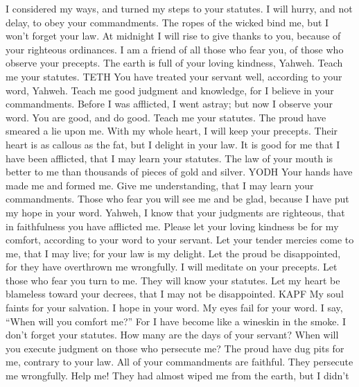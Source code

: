  I considered my ways, and turned my steps to your
statutes.  I will hurry, and not delay, to obey your
commandments.  The ropes of the wicked bind me, but I
won't forget your law.  At midnight I will rise to give
thanks to you, because of your righteous ordinances.  I
am a friend of all those who fear you, of those who observe your
precepts.  The earth is full of your loving kindness,
Yahweh. Teach me your statutes. TETH  You have treated
your servant well, according to your word, Yahweh.  Teach
me good judgment and knowledge, for I believe in your commandments.
 Before I was afflicted, I went astray; but now I observe
your word.  You are good, and do good. Teach me your
statutes.  The proud have smeared a lie upon me. With my
whole heart, I will keep your precepts.  Their heart is
as callous as the fat, but I delight in your law.  It is
good for me that I have been afflicted, that I may learn your statutes.
 The law of your mouth is better to me than thousands of
pieces of gold and silver. YODH  Your hands have made me
and formed me. Give me understanding, that I may learn your
commandments.  Those who fear you will see me and be
glad, because I have put my hope in your word.  Yahweh, I
know that your judgments are righteous, that in faithfulness you have
afflicted me.  Please let your loving kindness be for my
comfort, according to your word to your servant.  Let
your tender mercies come to me, that I may live; for your law is my
delight.  Let the proud be disappointed, for they have
overthrown me wrongfully. I will meditate on your precepts.
 Let those who fear you turn to me. They will know your
statutes.  Let my heart be blameless toward your decrees,
that I may not be disappointed. KAPF  My soul faints for
your salvation. I hope in your word.  My eyes fail for
your word. I say, ``When will you comfort me?''  For I
have become like a wineskin in the smoke. I don't forget your statutes.
 How many are the days of your servant? When will you
execute judgment on those who persecute me?  The proud
have dug pits for me, contrary to your law.  All of your
commandments are faithful. They persecute me wrongfully. Help me!
 They had almost wiped me from the earth, but I didn't
